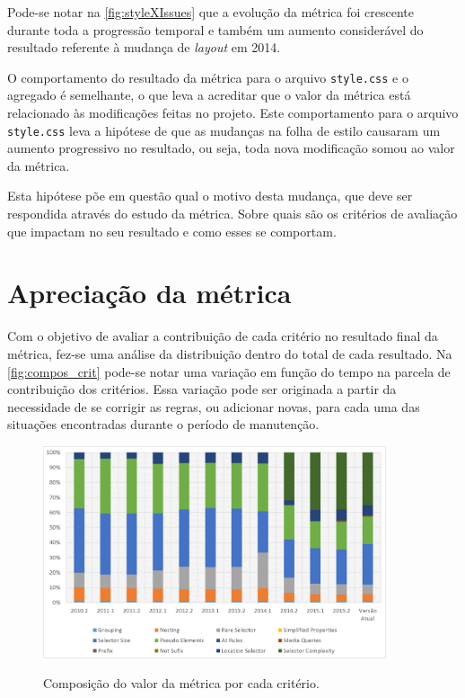 Pode-se notar na \autoref{fig:styleXIssues} que a evolução da métrica foi crescente durante toda a progressão temporal e também um aumento considerável do resultado referente à mudança de \textit{layout} em 2014.

O comportamento do resultado da métrica para o arquivo \texttt{style.css} e o agregado é semelhante, o que leva a acreditar que o valor da métrica está relacionado às modificações feitas no projeto. Este comportamento para o arquivo \texttt{style.css} leva a hipótese de que as mudanças na folha de estilo causaram um aumento progressivo no resultado, ou seja, toda nova modificação somou ao valor da métrica.

Esta hipótese põe em questão qual o motivo desta mudança, que deve ser respondida através do estudo da métrica. Sobre quais são os critérios de avaliação que impactam no seu resultado e como esses se comportam. 

\section{Apreciação da métrica}

Com o objetivo de avaliar a contribuição de cada critério no resultado final da métrica, fez-se uma análise da distribuição dentro do total de cada resultado. Na \autoref{fig:compos_crit} pode-se notar uma variação em função do tempo na parcela de contribuição dos critérios. Essa variação pode ser originada a partir da necessidade de se corrigir as regras, ou adicionar novas, para cada uma das situações encontradas durante o período de manutenção.

\begin{figure}[!htb]
	\centering
	\caption{Composição do valor da métrica por cada critério.}
	\includegraphics[width=0.9\textwidth]{./04-figuras/composition_criteria}
	\label{fig:compos_crit}
\end{figure}

